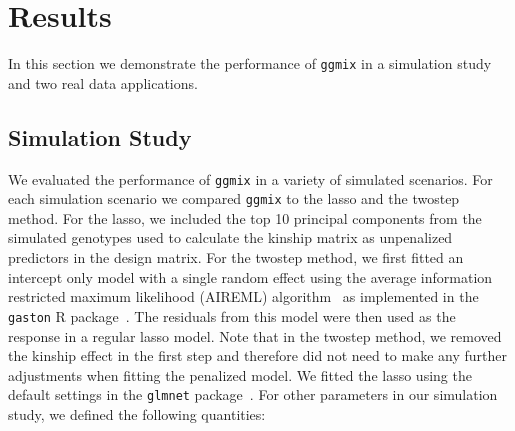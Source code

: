 \documentclass[12pt,letter]{article}\usepackage[]{graphicx}\usepackage[]{color}
\begin{document}
\FloatBarrier



\section{Results}

In this section we demonstrate the performance of \texttt{ggmix} in a simulation study and two real data applications. 
\subsection{Simulation Study} \label{simustudy}

We evaluated the performance of \texttt{ggmix} in a variety of simulated scenarios. For each simulation scenario we compared \texttt{ggmix} to the lasso and the twostep method. For the lasso, we included the top 10 principal components from the simulated genotypes used to calculate the kinship matrix as unpenalized predictors in the design matrix. For the twostep method, we first fitted an intercept only model with a single random effect using the average information restricted maximum likelihood (AIREML) algorithm~\citep{gilmour1995average} as implemented in the \texttt{gaston} R package~\citep{gaston}. The residuals from this model were then used as the response in a regular lasso model. Note that in the twostep method, we removed the kinship effect in the first step and therefore did not need to make any further adjustments when fitting the penalized model. We fitted the lasso using the default settings in the \texttt{glmnet} package~\citep{friedman2010regularization}. For other parameters in our simulation study, we defined the following quantities:
\end{document}
